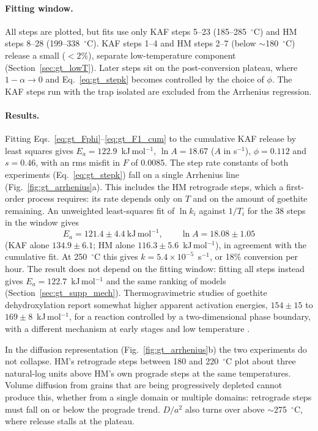 \paragraph{Fitting window.} All steps are plotted, but fits use only KAF steps 5--23
(185--285~$^\circ$C) and HM steps 8--28 (199--338~$^\circ$C). KAF steps 1--4 and HM steps 2--7
(below $\sim$180~$^\circ$C) release a small ($<2\%$), separate low-temperature component
(Section~\ref{sec:gt_lowT}). Later steps sit on the post-conversion plateau, where
$1-\alpha\to0$ and Eq.~\ref{eq:gt_stepk} becomes controlled by the choice of $\phi$. The KAF
steps run with the trap isolated are excluded from the Arrhenius regression.

\paragraph{Results.} Fitting Eqs.~\ref{eq:gt_Fphi}--\ref{eq:gt_F1_cum} to the cumulative KAF
release by least squares gives $E_a = 122.9$~kJ\,mol$^{-1}$, $\ln A = 18.67$ ($A$ in s$^{-1}$),
$\phi = 0.112$ and $s = 0.46$, with an rms misfit in $F$ of 0.0085. The step rate constants of
both experiments (Eq.~\ref{eq:gt_stepk}) fall on a single Arrhenius line
(Fig.~\ref{fig:gt_arrhenius}a). This includes the HM retrograde steps, which a first-order
process requires: its rate depends only on $T$ and on the amount of goethite remaining. An
unweighted least-squares fit of $\ln k_i$ against $1/T_i$ for the 38 steps in the window gives
\begin{equation}
  E_a = 121.4 \pm 4.4~\mathrm{kJ\,mol^{-1}},
  \qquad
  \ln A = 18.08 \pm 1.05
  \label{eq:gt_line}
\end{equation}
(KAF alone $134.9\pm6.1$; HM alone $116.3\pm5.6$~kJ\,mol$^{-1}$), in agreement with the cumulative
fit. At 250~$^\circ$C this gives $k = 5.4\times10^{-5}$~s$^{-1}$, or 18\% conversion per hour. The
result does not depend on the fitting window: fitting all steps instead gives
$E_a = 122.7$~kJ\,mol$^{-1}$ and the same ranking of models (Section~\ref{sec:gt_supp_mech}).
Thermogravimetric studies of goethite dehydroxylation report somewhat higher apparent activation
energies, $154\pm15$ to $169\pm8$~kJ\,mol$^{-1}$, for a reaction controlled by a two-dimensional
phase boundary, with a different mechanism at early stages and low temperature \citep{goss1987}.

In the diffusion representation (Fig.~\ref{fig:gt_arrhenius}b) the two experiments do not
collapse. HM's retrograde steps between 180 and 220~$^\circ$C plot about three natural-log units
above HM's own prograde steps at the same temperatures. Volume diffusion from grains that are
being progressively depleted cannot produce this, whether from a single domain or multiple
domains: retrograde steps must fall on or below the prograde trend. $D/a^2$ also turns over
above $\sim$275~$^\circ$C, where release stalls at the plateau.

